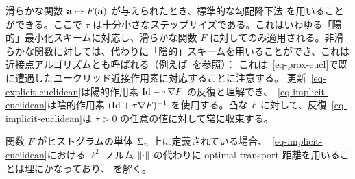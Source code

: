 滑らかな関数 $\mathrm{\textbf{a}} \mapsto F(\mathrm{\textbf{a}})$ が与えられたとき、標準的な勾配降下法
を用いることができる。ここで $\tau$ は十分小さなステップサイズである。これはいわゆる「陽的」最小化スキームに対応し、滑らかな関数 $F$ に対してのみ適用される。非滑らかな関数に対しては、代わりに「陰的」スキームを用いることができ、これは近接点アルゴリズムとも呼ばれる（例えば~\citet{BauschkeCombettes11}を参照）：
これは~\eqref{eq-prox-eucl}で既に遭遇したユークリッド近接作用素に対応することに注意する。
更新~\eqref{eq-explicit-euclidean}は陽的作用素 $\mathrm{Id}-\tau\nabla F$ の反復と理解でき、~\eqref{eq-implicit-euclidean}は陰的作用素 $(\mathrm{Id}+\tau\nabla F)^{-1}$ を使用する。凸な $F$ に対して、反復~\eqref{eq-implicit-euclidean}は $\tau>0$ の任意の値に対して常に収束する。

関数 $F$ がヒストグラムの単体 $\Sigma_n$ 上に定義されている場合、~\eqref{eq-implicit-euclidean}における $\ell^2$ ノルム $\left\| \cdot \right\|$ の代わりに optimal transport 距離を用いることは理にかなっており、
を解く。

